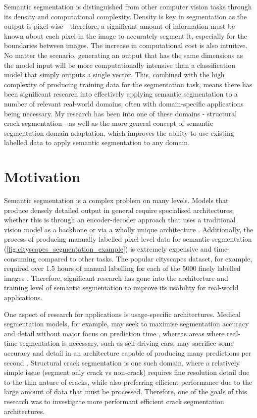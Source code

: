 \documentclass[a4paper,12pt]{report}
\begin{document}
Semantic segmentation is distinguished from other computer vision tasks through its density and computational complexity. Density is key in segmentation as the output is pixel-wise - therefore, a significant amount of information must be known about each pixel in the image to accurately segment it, especially for the boundaries between images. The increase in computational cost is also intuitive. No matter the scenario, generating an output that has the same dimensions as the model input will be more computationally intensive than a classification model that simply outputs a single vector. This, combined with the high complexity of producing training data for the segmentation task, means there has been significant research into effectively applying semantic segmentation to a number of relevant real-world domains, often with domain-specific applications being necessary. My research has been into one of these domains - structural crack segmentation - as well as the more general concept of semantic segmentation domain adaptation, which improves the ability to use existing labelled data to apply semantic segmentation to any domain.


\section{Motivation}
Semantic segmentation is a complex problem on many levels. Models that produce densely detailed output in general require specialised architectures, whether this is through an encoder-decoder approach that uses a traditional vision model as a backbone \cite{chen_deeplab_2017} or via a wholly unique architecture \cite{sandler_mobilenetv2_2019}. Additionally, the process of producing manually labelled pixel-level data for semantic segmentation (\autoref{fig:cityscapes_segmentation_example}) is extremely expensive and time-consuming compared to other tasks. The popular cityscapes dataset, for example, required over 1.5 hours of manual labelling for each of the 5000 finely labelled images \cite{cordts_cityscapes_2016}. Therefore, significant research has gone into the architecture and training level of semantic segmentation to improve its usability for real-world applications.

One aspect of research for applications is usage-specific architectures. Medical segmentation models, for example, may seek to maximise segmentation accuracy and detail without major focus on prediction time \cite{ronneberger_u-net_2015}, whereas areas where real-time segmentation is necessary, such as self-driving cars, may sacrifice some accuracy and detail in an architecture capable of producing many predictions per second \cite{poudel_fast-scnn_2019}. Structural crack segmentation is one such domain, where a relatively simple issue (segment only crack vs non-crack) requires fine resolution detail due to the thin nature of cracks, while also preferring efficient performance due to the large amount of data that must be processed. Therefore, one of the goals of this research was to investigate more performant efficient crack segmentation architectures.
\end{document}
